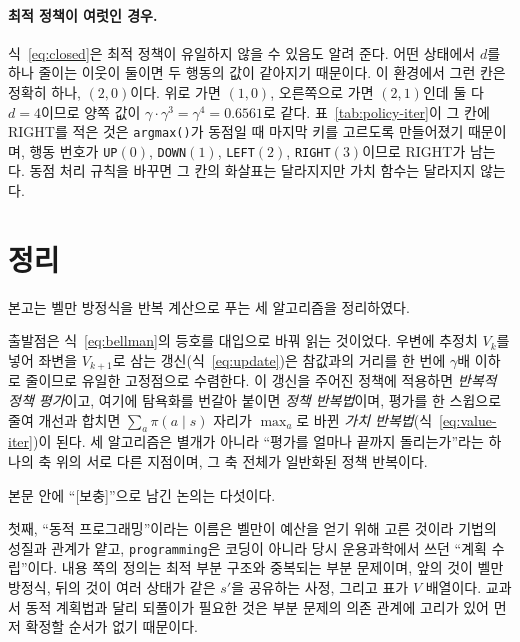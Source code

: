 \documentclass[11pt,a4paper]{article}
\begin{document}
\paragraph{최적 정책이 여럿인 경우.}
식~\eqref{eq:closed}은 최적 정책이 유일하지 않을 수 있음도 알려 준다. 어떤 상태에서 $d$를 하나
줄이는 이웃이 둘이면 두 행동의 값이 같아지기 때문이다. 이 환경에서 그런 칸은 정확히 하나,
$(2,0)$이다. 위로 가면 $(1,0)$, 오른쪽으로 가면 $(2,1)$인데 둘 다 $d=4$이므로 양쪽 값이
$\gamma\cdot\gamma^{3}=\gamma^{4}=0.6561$로 같다. 표~\ref{tab:policy-iter}이 그 칸에 RIGHT를 적은
것은 \lstinline|argmax()|가 동점일 때 마지막 키를 고르도록 만들어졌기 때문이며, 행동 번호가
\texttt{UP}$(0)$, \texttt{DOWN}$(1)$, \texttt{LEFT}$(2)$, \texttt{RIGHT}$(3)$이므로 RIGHT가 남는다.
동점 처리 규칙을 바꾸면 그 칸의 화살표는 달라지지만 가치 함수는 달라지지 않는다.

\section{정리}
\label{sec:summary}

본고는 벨만 방정식을 반복 계산으로 푸는 세 알고리즘을 정리하였다.

출발점은 식~\eqref{eq:bellman}의 등호를 대입으로 바꿔 읽는 것이었다. 우변에 추정치 $V_k$를 넣어
좌변을 $V_{k+1}$로 삼는 갱신(식~\eqref{eq:update})은 참값과의 거리를 한 번에 $\gamma$배 이하로 줄이므로
유일한 고정점으로 수렴한다. 이 갱신을 주어진 정책에 적용하면 \emph{반복적 정책 평가}이고, 여기에 탐욕화를 번갈아 붙이면
\emph{정책 반복법}이며, 평가를 한 스윕으로 줄여 개선과 합치면 $\sum_a\pi(a\mid s)$ 자리가 $\max_a$로
바뀐 \emph{가치 반복법}(식~\eqref{eq:value-iter})이 된다. 세 알고리즘은 별개가 아니라 ``평가를 얼마나
끝까지 돌리는가''라는 하나의 축 위의 서로 다른 지점이며, 그 축 전체가 일반화된 정책 반복이다.

본문 안에 ``[보충]''으로 남긴 논의는 다섯이다.

첫째, ``동적 프로그래밍''이라는 이름은 벨만이 예산을 얻기 위해 고른 것이라 기법의 성질과 관계가 얕고,
\texttt{programming}은 코딩이 아니라 당시 운용과학에서 쓰던 ``계획 수립''이다. 내용 쪽의 정의는 최적
부분 구조와 중복되는 부분 문제이며, 앞의 것이 벨만 방정식, 뒤의 것이 여러 상태가 같은 $s'$을 공유하는
사정, 그리고 표가 $V$ 배열이다. 교과서 동적 계획법과 달리 되풀이가 필요한 것은 부분 문제의 의존 관계에
고리가 있어 먼저 확정할 순서가 없기 때문이다.
\end{document}
